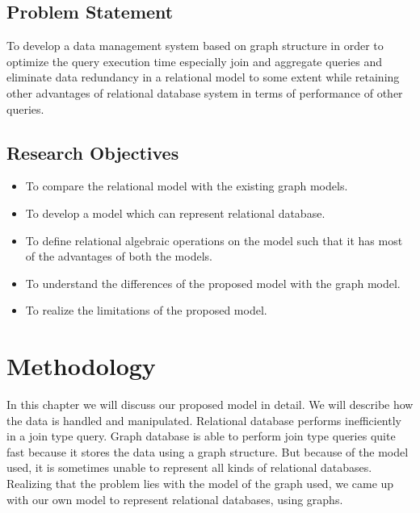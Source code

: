 \documentclass[12pt, oneside]{book}
\begin{document}
\section{Problem Statement}
To develop a data management system based on graph structure in order to optimize the query execution time especially join and aggregate queries and eliminate data redundancy in a relational model to some extent while retaining other advantages of relational database system in terms of performance of other queries.  

\section{Research Objectives}
\begin{itemize}
 \item To compare the relational model with the existing graph models.
 \item To develop a model which can represent relational database.
 \item To define relational algebraic operations on the model such that it has most of the advantages of both the models.
 \item To understand the differences of the proposed model with the graph model.
 \item To realize the limitations of the proposed model.
\end{itemize}

\chapter{Methodology}
In this chapter we will discuss our proposed model in detail. We will describe how the data is handled and manipulated.
Relational database performs inefficiently in a join type query. Graph database is able to perform join type queries quite fast because it stores the data using a graph structure. But because of the model used, it is sometimes unable to represent all kinds of relational databases. Realizing that the problem lies with the model of the graph used, we came up with our own model to represent relational databases, using graphs.\\ \par
\end{document}

